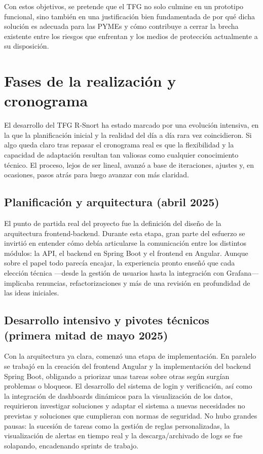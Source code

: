 \documentclass[11pt,a4paper,twoside]{report}
\begin{document}
Con estos objetivos, se pretende que el TFG no solo culmine en un prototipo funcional, sino también en una justificación bien fundamentada de por qué dicha solución es adecuada para las PYMEs y cómo contribuye a cerrar la brecha existente entre los riesgos que enfrentan y los medios de protección actualmente a su disposición.


\section{Fases de la realización y cronograma}

El desarrollo del TFG R-Snort ha estado marcado por una evolución intensiva, en la que la planificación inicial y la realidad del día a día rara vez coincidieron. Si algo queda claro tras repasar el cronograma real es que la flexibilidad y la capacidad de adaptación resultan tan valiosas como cualquier conocimiento técnico. El proceso, lejos de ser lineal, avanzó a base de iteraciones, ajustes y, en ocasiones, pasos atrás para luego avanzar con más claridad.

\subsection{Planificación y arquitectura (abril 2025)}

El punto de partida real del proyecto fue la definición del diseño de la arquitectura frontend-backend. Durante esta etapa, gran parte del esfuerzo se invirtió en entender cómo debía articularse la comunicación entre los distintos módulos: la API, el backend en Spring Boot y el frontend en Angular. Aunque sobre el papel todo parecía encajar, la experiencia pronto enseñó que cada elección técnica —desde la gestión de usuarios hasta la integración con Grafana— implicaba renuncias, refactorizaciones y más de una revisión en profundidad de las ideas iniciales.

\subsection{Desarrollo intensivo y pivotes técnicos (primera mitad de mayo 2025)}

Con la arquitectura ya clara, comenzó una etapa de implementación. En paralelo se trabajó en la creación del frontend Angular y la implementación del backend Spring Boot, obligando a priorizar unas tareas sobre otras según surgían problemas o bloqueos. El desarrollo del sistema de login y verificación, así como la integración de dashboards dinámicos para la visualización de los datos, requirieron investigar soluciones y adaptar el sistema a nuevas necesidades no previstas y soluciones que cumplieran con normas de seguridad. No hubo grandes pausas: la sucesión de tareas como la gestión de reglas personalizadas, la visualización de alertas en tiempo real y la descarga/archivado de logs se fue solapando, encadenando sprints de trabajo.
\end{document}

